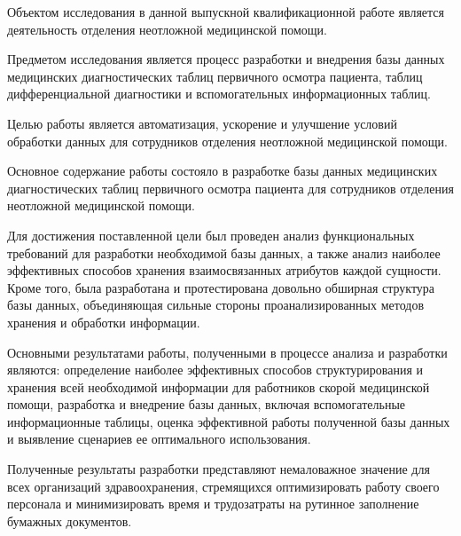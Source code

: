 \abstract %


Объектом исследования в данной выпускной квалификационной работе является деятельность отделения неотложной медицинской помощи.

Предметом исследования является процесс разработки и внедрения базы данных медицинских диагностических таблиц первичного осмотра пациента, таблиц дифференциальной диагностики и вспомогательных информационных таблиц.

Целью работы является автоматизация, ускорение и улучшение условий обработки данных для сотрудников отделения неотложной медицинской помощи.

Основное содержание работы состояло в разработке базы данных медицинских диагностических таблиц первичного осмотра пациента для сотрудников отделения неотложной медицинской помощи.

Для достижения поставленной цели был проведен анализ функциональных требований для разработки необходимой базы данных, а также анализ наиболее эффективных способов хранения взаимосвязанных атрибутов каждой сущности. Кроме того, была разработана и протестирована довольно обширная структура базы данных, объединяющая сильные стороны проанализированных методов хранения и обработки информации.

Основными результатами работы, полученными в процессе анализа и разработки являются: определение наиболее эффективных способов структурирования и хранения всей необходимой информации для работников скорой медицинской помощи, разработка и внедрение базы данных, включая вспомогательные информационные таблицы, оценка эффективной работы полученной базы данных и выявление сценариев ее оптимального использования.

Полученные результаты разработки представляют немаловажное значение для всех организаций здравоохранения, стремящихся оптимизировать работу своего персонала и минимизировать время и трудозатраты на рутинное заполнение бумажных документов.